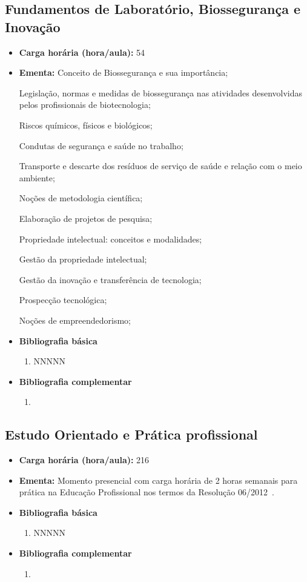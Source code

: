 \documentclass[11pt,fleqn]{book} %
\begin{document}
\subsection{Fundamentos de Laboratório, Biossegurança e Inovação}\label{disc:bioseg}
\begin{itemize}
	\item \textbf{Carga horária (hora/aula):} 54
	\item \textbf{Ementa:} 
	Conceito de Biossegurança e sua importância; 
	
	Legislação, normas e medidas de biossegurança nas atividades desenvolvidas pelos profissionais de biotecnologia; 
	
	Riscos químicos, físicos e biológicos;
	
	Condutas de segurança e saúde no trabalho; 
	
	Transporte e descarte dos resíduos de serviço de saúde e relação com o meio ambiente; 
	
	Noções de metodologia científica;
	
	Elaboração de projetos de pesquisa; 
	
	Propriedade intelectual: conceitos e modalidades;
	
	Gestão da propriedade intelectual;
	
	Gestão da inovação e transferência de tecnologia;
	
	Prospecção tecnológica;
	
	Noções de empreendedorismo;	
	\item \textbf{Bibliografia básica}
	\begin{enumerate}
		\item NNNNN
	\end{enumerate}
	\item \textbf{Bibliografia complementar}
	\begin{enumerate}
		\item 
	\end{enumerate}	
\end{itemize}

\newpage
\subsection{Estudo Orientado e Prática profissional}\label{disc:pratica}
\indent
\begin{itemize}
	\item \textbf{Carga horária (hora/aula):} 216
	\item \textbf{Ementa:} Momento presencial com carga horária de 2 horas semanais para prática na Educação Profissional nos termos da Resolução 06/2012~\cite{Resolucao06De2012}.
	\item \textbf{Bibliografia básica}
	\begin{enumerate}
		\item NNNNN
	\end{enumerate}
	\item \textbf{Bibliografia complementar}
	\begin{enumerate}
		\item 
	\end{enumerate}	
\end{itemize}
\end{document}
